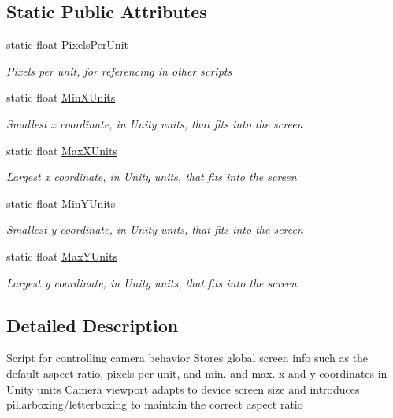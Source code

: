 \subsection*{Static Public Attributes}
\begin{DoxyCompactItemize}
\item 
static float \hyperlink{class_camera_controller_a382108f331b87cc67e6694cde84b3910}{Pixels\+Per\+Unit}
\begin{DoxyCompactList}\small\item\em Pixels per unit, for referencing in other scripts \end{DoxyCompactList}\item 
static float \hyperlink{class_camera_controller_afbf830e2978734f35fb745fd63d13ca4}{Min\+X\+Units}
\begin{DoxyCompactList}\small\item\em Smallest x coordinate, in Unity units, that fits into the screen \end{DoxyCompactList}\item 
static float \hyperlink{class_camera_controller_a6b97db2514a3f59c74eb56a013e00c85}{Max\+X\+Units}
\begin{DoxyCompactList}\small\item\em Largest x coordinate, in Unity units, that fits into the screen \end{DoxyCompactList}\item 
static float \hyperlink{class_camera_controller_a66577648bab85619c6e72059e0ac4029}{Min\+Y\+Units}
\begin{DoxyCompactList}\small\item\em Smallest y coordinate, in Unity units, that fits into the screen \end{DoxyCompactList}\item 
static float \hyperlink{class_camera_controller_a1467ca3823ce8566582bcb6a37d19913}{Max\+Y\+Units}
\begin{DoxyCompactList}\small\item\em Largest y coordinate, in Unity units, that fits into the screen \end{DoxyCompactList}\end{DoxyCompactItemize}


\subsection{Detailed Description}
Script for controlling camera behavior Stores global screen info such as the default aspect ratio, pixels per unit, and min. and max. x and y coordinates in Unity units Camera viewport adapts to device screen size and introduces pillarboxing/letterboxing to maintain the correct aspect ratio 




